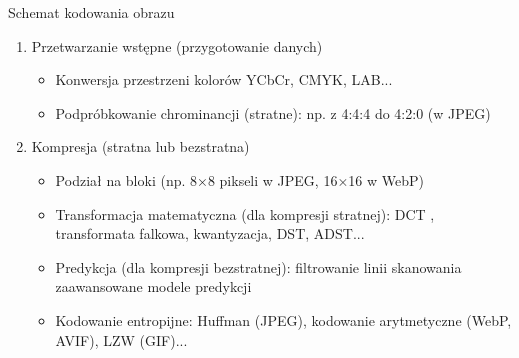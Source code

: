 \documentclass[aspectratio=1610]{beamer}
\begin{document}
\begin{frame}{Schemat kodowania obrazu}
  \begin{enumerate}
  \item Przetwarzanie wstępne (przygotowanie danych)

\begin{itemize}
\item Konwersja przestrzeni kolorów
  {YCbCr}, {CMYK}, {LAB}...
\item Podpróbkowanie chrominancji (stratne):
 np. z 4:4:4 do 4:2:0 (w JPEG)


\end{itemize}

\item Kompresja (stratna lub bezstratna)

\begin{itemize}
\item Podział na bloki (np. 8×8 pikseli w JPEG, 16×16 w WebP)

\item Transformacja matematyczna (dla kompresji stratnej): 
{DCT} %
, 
{transformata falkowa}, 
{kwantyzacja}, DST, ADST...

\item Predykcja (dla kompresji bezstratnej):
filtrowanie linii skanowania 
 zaawansowane modele predykcji

\item Kodowanie entropijne:
{Huffman (JPEG)},
{kodowanie arytmetyczne (WebP, AVIF)},
{LZW (GIF)}...
\end{itemize}


\end{enumerate}
\end{frame}
\end{document}
